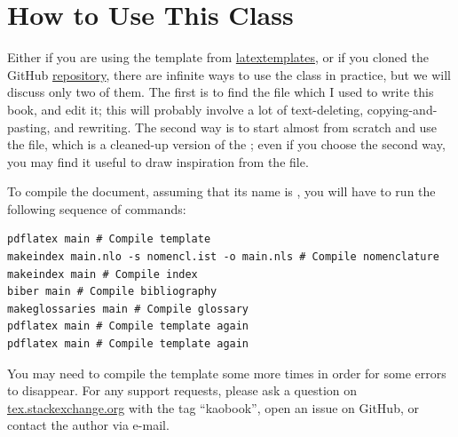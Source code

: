 \section{How to Use This Class}

Either if you are using the template from 
\href{http://latextemplates.org/template/kaobook}{latextemplates}, or if 
you cloned the GitHub 
\href{https://www.github.com/fmarotta/kaobook}{repository}, there are 
infinite ways to use the  class in practice, but we will 
discuss only two of them. The first is to find the  file 
which I used to write this book, and edit it; this will probably involve 
a lot of text-deleting, copying-and-pasting, and rewriting. The second 
way is to start almost from scratch and use the  
file, which is a cleaned-up version of the ; even if you 
choose the second way, you may find it useful to draw inspiration from 
the  file.

To compile the document, assuming that its name is , you 
will have to run the following sequence of commands:

\begin{lstlisting}[style=kaolstplain,linewidth=1.5\textwidth]
pdflatex main # Compile template
makeindex main.nlo -s nomencl.ist -o main.nls # Compile nomenclature
makeindex main # Compile index
biber main # Compile bibliography
makeglossaries main # Compile glossary
pdflatex main # Compile template again
pdflatex main # Compile template again
\end{lstlisting}

You may need to compile the template some more times in order for some 
errors to disappear. For any support requests, please ask a question on 
\url{tex.stackexchange.org} with the tag \enquote{kaobook}, open an 
issue on GitHub, or contact the author via e-mail.

